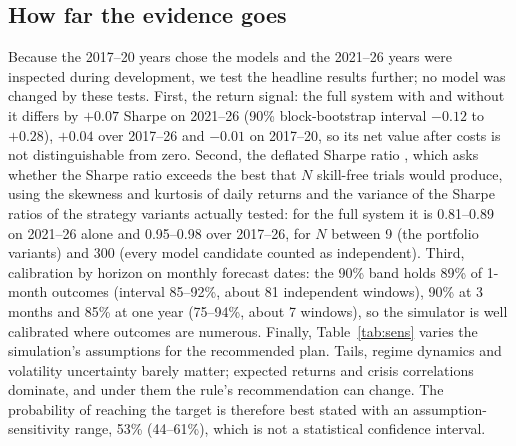 \documentclass[conference]{IEEEtran}
\begin{document}
\subsection{How far the evidence goes}
Because the 2017--20 years chose the models and the 2021--26 years were inspected during development, we test the headline results further; no model was changed by these tests. First, the return signal: the full system with and without it differs by $+0.07$ Sharpe on 2021--26 (90\% block-bootstrap interval $-0.12$ to $+0.28$), $+0.04$ over 2017--26 and $-0.01$ on 2017--20, so its net value after costs is not distinguishable from zero. Second, the deflated Sharpe ratio \cite{bailey2014}, which asks whether the Sharpe ratio exceeds the best that $N$ skill-free trials would produce, using the skewness and kurtosis of daily returns and the variance of the Sharpe ratios of the strategy variants actually tested: for the full system it is 0.81--0.89 on 2021--26 alone and 0.95--0.98 over 2017--26, for $N$ between 9 (the portfolio variants) and 300 (every model candidate counted as independent). Third, calibration by horizon on monthly forecast dates: the 90\% band holds 89\% of 1-month outcomes (interval 85--92\%, about 81 independent windows), 90\% at 3 months and 85\% at one year (75--94\%, about 7 windows), so the simulator is well calibrated where outcomes are numerous. Finally, Table~\ref{tab:sens} varies the simulation's assumptions for the recommended plan. Tails, regime dynamics and volatility uncertainty barely matter; expected returns and crisis correlations dominate, and under them the rule's recommendation can change. The probability of reaching the target is therefore best stated with an assumption-sensitivity range, 53\% (44--61\%), which is not a statistical confidence interval.
\end{document}
